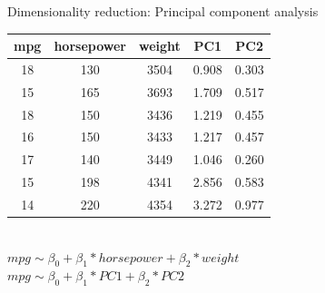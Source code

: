 \documentclass[8pt]{beamer}
\begin{document}
    \begin{frame}[t]{Dimensionality reduction: Principal component analysis} %
        \centering
        \vspace{1cm}
        \begin{tabular}{|c|c|c|c|c|}
            \hline
            \textbf{mpg}&\textbf{horsepower}&\textbf{weight}&\textbf{PC1}&\textbf{PC2}\\
            \hline
            18&130&3504&0.908&0.303\\
            \hline
            15&165&3693&1.709&0.517\\
            \hline
            18&150&3436&1.219&0.455\\
            \hline
            16&150&3433&1.217&0.457\\
            \hline
            17&140&3449&1.046&0.260\\
            \hline
            15&198&4341&2.856&0.583\\
            \hline
            14&220&4354&3.272&0.977\\
            \hline
        \end{tabular}\\
        \vspace{0.5cm}
        $mpg \sim \beta_0 + \beta_1 * horsepower + \beta_2 * weight$\\
        \vspace{0.25cm}
        $mpg \sim \beta_0 + \beta_1 * PC1 + \beta_2 * PC2$
    \end{frame}
\end{document}
